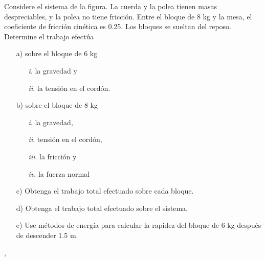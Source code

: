 \begin{frame}
    Considere el sistema de la
figura. La cuerda y la polea
tienen masas despreciables, y la
polea no tiene fricción. Entre el
bloque de 8 kg y la mesa,
el coeficiente de fricción cinética
es 0.25. Los bloques se
sueltan del reposo. Determine el trabajo efectúa \begin{itemize}
    \item[a)] sobre el bloque de 6 kg \begin{itemize}
        \item[\textit{i}.] la gravedad y
        \item[\textit{ii}.] la tensión en el cordón.
    \end{itemize}
    \item[b)] sobre el bloque de 8 kg \begin{itemize}
        \item[\textit{i}.] la gravedad,
        \item[\textit{ii}.] tensión en el cordón,
        \item[\textit{iii}.] la fricción y
        \item[\textit{iv}.] la fuerza normal
    \end{itemize}
    \item[c)] Obtenga el trabajo total efectuado sobre cada bloque.
    \item[d)] Obtenga el trabajo total efectuado sobre el sistema.
    \item[e)] Use métodos de energía para calcular la rapidez del bloque de 6 kg después de descender 1.5 m.
\end{itemize}, 



\end{frame}